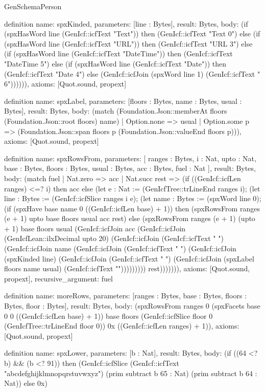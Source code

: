 \begin{lexlean}{GenSchemaPerson}
\begin{semanticmodule}
{definition{
  name: spxKinded,
  parameters: [line : Bytes],
  result: Bytes,
  body: (if (spxHasWord line (GenIcf::icfText "Text")) then (GenIcf::icfText "Text 0") else (if (spxHasWord line (GenIcf::icfText "URL")) then (GenIcf::icfText "URL 3") else (if (spxHasWord line (GenIcf::icfText "DateTime")) then (GenIcf::icfText "DateTime 5") else (if (spxHasWord line (GenIcf::icfText "Date")) then (GenIcf::icfText "Date 4") else (GenIcf::icfJoin (spxWord line 1) (GenIcf::icfText " 6")))))),
  axioms: [Quot.sound, propext]
}

definition{
  name: spxLabel,
  parameters: [floors : Bytes, name : Bytes, usual : Bytes],
  result: Bytes,
  body: (match (Foundation.Json::memberAt floors (Foundation.Json::root floors) name)
    | Option.none => usual
    | Option.some p => (Foundation.Json::span floors p (Foundation.Json::valueEnd floors p))),
  axioms: [Quot.sound, propext]
}

definition{
  name: spxRowsFrom,
  parameters: [
    ranges : Bytes,
    i : Nat,
    upto : Nat,
    base : Bytes,
    floors : Bytes,
    usual : Bytes,
    acc : Bytes,
    fuel : Nat
  ],
  result: Bytes,
  body: (match fuel
    | Nat.zero => acc
    | Nat.succ rest => (if ((GenIcf::icfLen ranges) <=? i) then acc else (let e : Nat := (GenIcfTree::trLineEnd ranges i); (let line : Bytes := (GenIcf::icfSlice ranges i e); (let name : Bytes := (spxWord line 0); (if (spxHave base name 0 ((GenIcf::icfLen base) + 1)) then (spxRowsFrom ranges (e + 1) upto base floors usual acc rest) else (spxRowsFrom ranges (e + 1) (upto + 1) base floors usual (GenIcf::icfJoin acc (GenIcf::icfJoin (GenIcfLean::ilxDecimal upto 20) (GenIcf::icfJoin (GenIcf::icfText " ") (GenIcf::icfJoin name (GenIcf::icfJoin (GenIcf::icfText " ") (GenIcf::icfJoin (spxKinded line) (GenIcf::icfJoin (GenIcf::icfText " ") (GenIcf::icfJoin (spxLabel floors name usual) (GenIcf::icfText "\n"))))))))) rest))))))),
  axioms: [Quot.sound, propext],
  recursive_argument: fuel
}

definition{
  name: moreRows,
  parameters: [ranges : Bytes, base : Bytes, floors : Bytes, floor : Bytes],
  result: Bytes,
  body: (spxRowsFrom ranges 0 (spxFacets base 0 0 ((GenIcf::icfLen base) + 1)) base floors (GenIcf::icfSlice floor 0 (GenIcfTree::trLineEnd floor 0)) 0x ((GenIcf::icfLen ranges) + 1)),
  axioms: [Quot.sound, propext]
}

definition{
  name: spxLower,
  parameters: [b : Nat],
  result: Bytes,
  body: (if ((64 <? b) && (b <? 91)) then (GenIcf::icfSlice (GenIcf::icfText "abcdefghijklmnopqrstuvwxyz") (prim subtract b 65 : Nat) (prim subtract b 64 : Nat)) else 0x)
}

}
\end{semanticmodule}
\end{lexlean}
